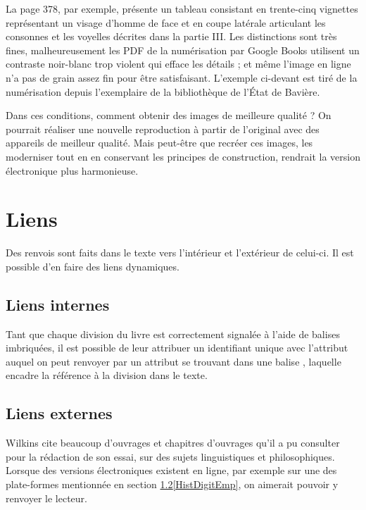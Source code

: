 La page 378, par exemple, présente un tableau consistant en trente-cinq vignettes représentant un visage d'homme de face et en coupe latérale articulant les consonnes et les voyelles décrites dans la partie III.
Les distinctions sont très fines, malheureusement les PDF de la numérisation par Google Books utilisent un contraste noir-blanc trop violent qui efface les détails ; et même l'image en ligne n'a pas de grain assez fin pour être satisfaisant.
L'exemple ci-devant est tiré de la numérisation depuis l'exemplaire de la bibliothèque de l'État de Bavière.

Dans ces conditions, comment obtenir des images de meilleure qualité ?
On pourrait réaliser une nouvelle reproduction à partir de l'original avec des appareils de meilleur qualité.
Mais peut-être que recréer ces images, les moderniser tout en en conservant les principes de construction, rendrait la version électronique plus harmonieuse.
\section{Liens}\label{DéfisLiens}
Des renvois sont faits dans le texte vers l'intérieur et l'extérieur de celui-ci.
Il est possible d'en faire des liens dynamiques.
	\subsection{Liens internes}
Tant que chaque division du livre est correctement signalée à l'aide de balises imbriquées, il est possible de leur attribuer un identifiant unique avec l'attribut  auquel on peut renvoyer par un attribut  se trouvant dans une balise , laquelle encadre la référence à la division dans le texte.
	\subsection{Liens externes}
Wilkins cite beaucoup d'ouvrages et chapitres d'ouvrages qu'il a pu consulter pour la rédaction de son essai, sur des sujets linguistiques et philosophiques.
Lorsque des versions électroniques existent en ligne, par exemple sur une des plate-formes mentionnée en section \ref{}\ref{HistDigitEmp}, on aimerait pouvoir y renvoyer le lecteur.